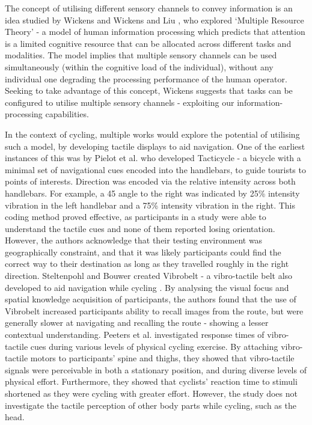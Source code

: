 \documentclass{interim}
\begin{document}
The concept of utilising different sensory channels to convey information is an idea studied by Wickens \cite{wickens1984processing} and Wickens and Liu \cite{doi:10.1177/001872088803000505}, who explored ‘Multiple Resource Theory’ - a model of human information processing which predicts that attention is a limited cognitive resource that can be allocated across different tasks and modalities. The model implies that multiple sensory channels can be used simultaneously (within the cognitive load of the individual), without any individual one degrading the processing performance of the human operator. Seeking to take advantage of this concept, Wickens suggests that tasks can be configured to utilise multiple sensory channels - exploiting our information-processing capabilities.

In the context of cycling, multiple works would explore the potential of utilising such a model, by developing tactile displays to aid navigation. One of the earliest instances of this was by Pielot et al. \cite{10.1145/2371574.2371631} who developed Tacticycle - a bicycle with a minimal set of navigational cues encoded into the handlebars, to guide tourists to points of interests. Direction was encoded via the relative intensity across both handlebars. For example, a 45\degree{} angle to the right was indicated by 25\% intensity vibration in the left handlebar and a 75\% intensity vibration in the right. This coding method proved effective, as participants in a study were able to understand the tactile cues and none of them reported losing orientation. However, the authors acknowledge that their testing environment was geographically constraint, and that it was likely participants could find the correct way to their destination as long as they travelled roughly in the right direction. Steltenpohl and Bouwer \cite{10.1145/2449396.2449450} created Vibrobelt - a vibro-tactile belt also developed to aid navigation while cycling . By analysing the visual focus and spatial knowledge acquisition of participants, the authors found that the use of Vibrobelt increased participants ability to recall images from the route, but were generally slower at navigating and recalling the route - showing a lesser contextual understanding. Peeters et al. \cite{peeters2019vibrotactile} investigated response times of vibro-tactile cues during various levels of physical cycling exercise. By attaching vibro-tactile motors to participants' spine and thighs, they showed that vibro-tactile signals were perceivable in both a stationary position, and during diverse levels of physical effort. Furthermore, they showed that cyclists' reaction time to stimuli shortened as they were cycling with greater effort. However, the study does not investigate the tactile perception of other body parts while cycling, such as the head.
\end{document}
